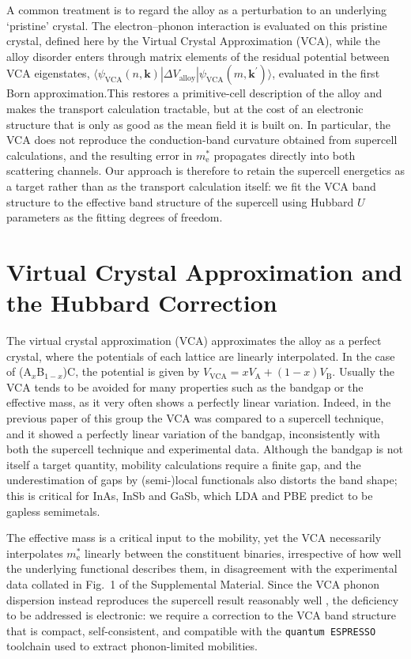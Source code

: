 \documentclass[aps,prmaterials,reprint,amsmath,amssymb,superscriptaddress]{revtex4-2}
\begin{document}
A common treatment is to regard the alloy as a perturbation to an underlying `pristine' crystal\cite{Harrison1976,Sewell2024}. The electron--phonon interaction is evaluated on this pristine crystal, defined here by the Virtual Crystal Approximation (VCA), while the alloy disorder enters through matrix elements of the residual potential between VCA eigenstates, $\langle\psi_\text{VCA}(n,\bm{k})|\Delta V_\text{alloy}| \psi_\text{VCA}(m,\bm{k}^\prime)\rangle$, evaluated in the first Born approximation.This restores a primitive-cell description of the alloy and makes the transport calculation tractable, but at the cost of an electronic structure that is only as good as the mean field it is built on. In particular, the VCA does not reproduce the conduction-band curvature obtained from supercell calculations, and the resulting error in $m^*_\text{e}$ propagates directly into both scattering channels. Our approach is therefore to retain the supercell energetics as a target rather than as the transport calculation itself: we fit the VCA band structure to the effective band structure of the supercell using Hubbard $U$ parameters as the fitting degrees of freedom. 

\section{Virtual Crystal Approximation and the Hubbard Correction}\label{sec:VCA}

The virtual crystal approximation (VCA) approximates the alloy as a perfect crystal, where the potentials of each lattice are linearly interpolated. In the case of (A$_x$B$_{1-x}$)C, the potential is given by $V_\text{VCA}=x V_\text{A}+(1-x)V_\text{B}$. Usually the VCA tends to be avoided for many properties such as the bandgap or the effective mass, as it very often shows a perfectly linear variation. Indeed, in the previous paper of this group the VCA was compared to a supercell technique, and it showed a perfectly linear variation of the bandgap, inconsistently with both the supercell technique and experimental data\cite{Gentles2026a}. 
Although the bandgap is not itself a target quantity, mobility calculations require a finite gap, and the underestimation of gaps by (semi-)local functionals\cite{Perdew2009} also distorts the band shape; this is critical for InAs, InSb and GaSb, which LDA and PBE predict to be gapless semimetals\cite{derivativedis_Perdew1983}.


The effective mass is a critical input to the mobility\cite{Dehghani2025}, yet the VCA necessarily interpolates $m^*_\text{e}$ linearly between the constituent binaries, irrespective of how well the underlying functional describes them, in disagreement with the experimental data collated in Fig.~1 of the Supplemental Material. Since the VCA phonon dispersion instead reproduces the supercell result reasonably well \cite{MurphyArmando2008}, the deficiency to be addressed is electronic: we require a correction to the VCA band structure that is compact, self-consistent, and compatible with the \texttt{quantum ESPRESSO} toolchain used to extract phonon-limited mobilities.
\end{document}
